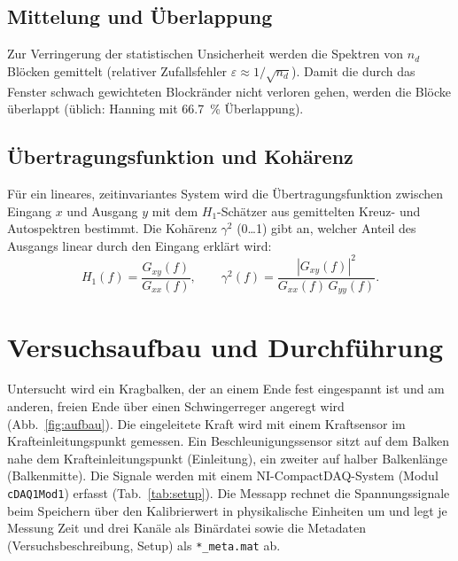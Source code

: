 \documentclass[a4paper,11pt,parskip=half,toc=listof,bibliography=totoc]{scrartcl}
\newcommand{\abb}[1]{Abb.~\ref{#1}}
\newcommand{\tab}[1]{Tab.~\ref{#1}}
\begin{document}
\subsection{Mittelung und Überlappung}
Zur Verringerung der statistischen Unsicherheit werden die Spektren von
$n_d$ Blöcken gemittelt (relativer Zufallsfehler $\varepsilon\approx
1/\sqrt{n_d}$). Damit die durch das Fenster schwach gewichteten Blockränder
nicht verloren gehen, werden die Blöcke überlappt (üblich: Hanning mit
\SI{66.7}{\percent} Überlappung).

\subsection{Übertragungsfunktion und Kohärenz}
Für ein lineares, zeitinvariantes System wird die Übertragungsfunktion
zwischen Eingang $x$ und Ausgang $y$ mit dem $H_1$-Schätzer aus gemittelten
Kreuz- und Autospektren bestimmt. Die Kohärenz $\gamma^2$ (0\ldots1) gibt an,
welcher Anteil des Ausgangs linear durch den Eingang erklärt wird:
\begin{equation}
  H_1(f) = \frac{G_{xy}(f)}{G_{xx}(f)}, \qquad
  \gamma^2(f) = \frac{|G_{xy}(f)|^2}{G_{xx}(f)\,G_{yy}(f)} .
\end{equation}

\section{Versuchsaufbau und Durchführung}
Untersucht wird ein Kragbalken, der an einem Ende fest eingespannt ist und am
anderen, freien Ende über einen Schwingerreger angeregt wird
(\abb{fig:aufbau}). Die eingeleitete Kraft wird mit einem Kraftsensor im
Krafteinleitungspunkt gemessen. Ein Beschleunigungssensor sitzt auf dem Balken
nahe dem Krafteinleitungspunkt (\glqq Einleitung\grqq), ein zweiter auf halber
Balkenlänge (\glqq Balkenmitte\grqq). Die Signale werden mit einem NI-CompactDAQ-System
(Modul \texttt{cDAQ1Mod1}) erfasst (\tab{tab:setup}). Die Messapp rechnet die
Spannungssignale beim Speichern über den Kalibrierwert in physikalische
Einheiten um und legt je Messung Zeit und drei Kanäle als Binärdatei sowie
die Metadaten (Versuchsbeschreibung, Setup) als \texttt{*\_meta.mat} ab.
\end{document}
